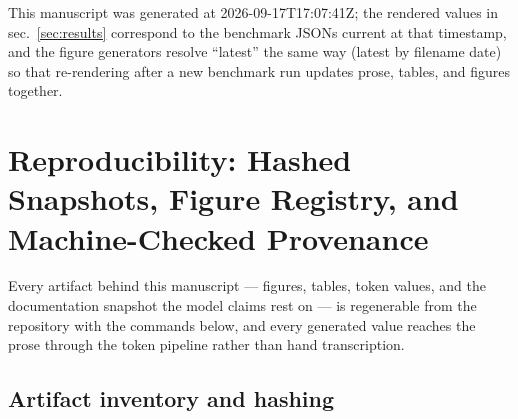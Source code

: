 \documentclass[
  english,
]{article}
\begin{document}
This manuscript was generated at 2026-09-17T17:07:41Z; the rendered
values in sec.~\ref{sec:results} correspond to the benchmark JSONs
current at that timestamp, and the figure generators resolve ``latest''
the same way (latest by filename date) so that re-rendering after a new
benchmark run updates prose, tables, and figures together.

\newpage

\section{Reproducibility: Hashed Snapshots, Figure Registry, and
Machine-Checked Provenance}\label{sec:reproducibility}

Every artifact behind this manuscript --- figures, tables, token values,
and the documentation snapshot the model claims rest on --- is
regenerable from the repository with the commands below, and every
generated value reaches the prose through the token pipeline rather than
hand transcription.

\subsection{Artifact inventory and
hashing}\label{artifact-inventory-and-hashing}
\end{document}
